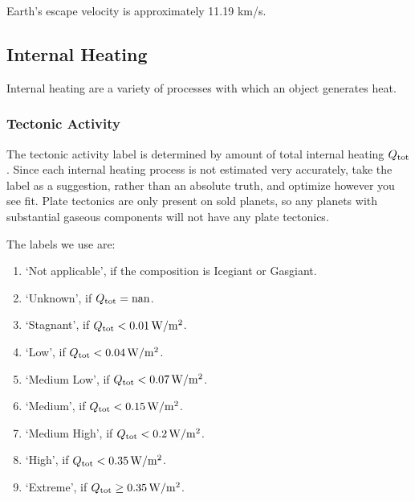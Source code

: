 \documentclass[letterpaper,10pt,english]{sphinxmanual}
\begin{document}
\sphinxAtStartPar
Earth’s escape velocity is approximately 11.19 km/s.


\subsection{Internal Heating}
\label{\detokenize{quantities/surface/internal_heating/internal_heating:internal-heating}}\label{\detokenize{quantities/surface/internal_heating/internal_heating::doc}}\label{\detokenize{quantities/surface/internal_heating/internal_heating:id1}}
\sphinxAtStartPar
Internal heating are a variety of processes with which an object generates heat.


\subsubsection{Tectonic Activity}
\label{\detokenize{quantities/surface/internal_heating/tectonic_activity:tectonic-activity}}\label{\detokenize{quantities/surface/internal_heating/tectonic_activity::doc}}\label{\detokenize{quantities/surface/internal_heating/tectonic_activity:id1}}
\sphinxAtStartPar
The tectonic activity label is determined by amount of total internal heating \(Q_{\rm tot}\).
Since each internal heating process is not estimated very accurately, take the
label as a suggestion, rather than an absolute truth, and optimize however you see fit.
Plate tectonics are only present on sold planets, so any planets with substantial gaseous
components will not have any plate tectonics.

\sphinxAtStartPar
The labels we use are:
\begin{enumerate}
%
\item {} 
\sphinxAtStartPar
‘Not applicable’, if the composition is Icegiant or Gasgiant.

\item {} 
\sphinxAtStartPar
‘Unknown’, if \(Q_{\rm tot} = {\rm nan}\).

\item {} 
\sphinxAtStartPar
‘Stagnant’, if \(Q_{\rm tot} < 0.01 \, {\rm W/m^2}\).

\item {} 
\sphinxAtStartPar
‘Low’, if \(Q_{\rm tot} < 0.04 \, {\rm W/m^2}\).

\item {} 
\sphinxAtStartPar
‘Medium Low’, if \(Q_{\rm tot} < 0.07 \, {\rm W/m^2}\).

\item {} 
\sphinxAtStartPar
‘Medium’, if \(Q_{\rm tot} < 0.15 \, {\rm W/m^2}\).

\item {} 
\sphinxAtStartPar
‘Medium High’, if \(Q_{\rm tot} < 0.2 \, {\rm W/m^2}\).

\item {} 
\sphinxAtStartPar
‘High’, if \(Q_{\rm tot} < 0.35 \, {\rm W/m^2}\).

\item {} 
\sphinxAtStartPar
‘Extreme’, if \(Q_{\rm tot} \ge 0.35 \, {\rm W/m^2}\).

\end{enumerate}
\end{document}

